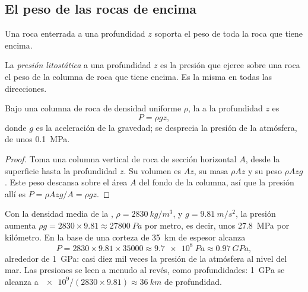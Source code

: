 \subsection{El peso de las rocas de encima}

Una roca enterrada a una profundidad $z$ soporta el peso de toda la roca que tiene encima.

\begin{definition}\label{def:g12:metamorphic-rocks:lithostatic}
La \emph{presión litostática} a una
profundidad $z$ es la presión que ejerce sobre una roca el peso de la columna
de roca que tiene encima. Es la misma en todas las direcciones.
\end{definition}

\begin{proposition}\label{prop:g12:metamorphic-rocks:lithostatic}
Bajo una columna de roca de densidad uniforme $\rho$, la 
a la profundidad $z$ es
\[
  P = \rho g z ,
\]
donde $g$ es la aceleración de la gravedad; se desprecia la presión de la
atmósfera, de unos \qty{0.1}{MPa}.
\end{proposition}

\begin{proof}
Toma una columna vertical de roca de sección horizontal $A$, desde la
superficie hasta la profundidad $z$. Su volumen es $Az$, su masa $\rho A z$ y
su peso $\rho A z g$. Este peso descansa sobre el área $A$ del fondo de la
columna, así que la presión allí es $P = \rho A z g / A = \rho g z$.
\end{proof}

Con la densidad media de la , $\rho = \qty{2830}{kg/m^3}$,
y $g = \qty{9.81}{m/s^2}$, la presión aumenta $\rho g = 2830 \times 9.81
\approx \qty{27800}{Pa}$ por metro, es decir, unos \qty{27.8}{MPa} por
kilómetro. En la base de una corteza de \qty{35}{km} de espesor alcanza
\[
  P = 2830 \times 9.81 \times \num{35000} \approx \qty{9.7e8}{Pa} \approx
  \qty{0.97}{GPa},
\]
alrededor de \qty{1}{GPa}: casi diez mil veces la presión de la atmósfera al
nivel del mar. Las presiones se leen a menudo al revés, como profundidades:
\qty{1}{GPa} se alcanza a $\num{e9}/(2830 \times 9.81) \approx \qty{36}{km}$
de profundidad.

